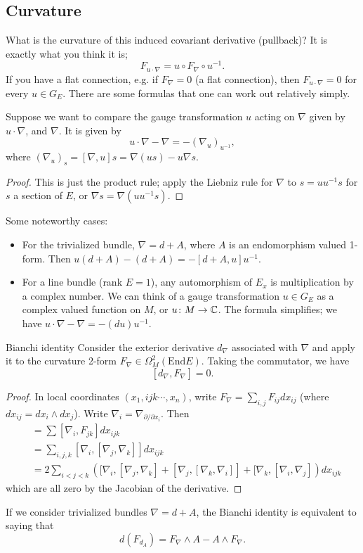 \subsection{Curvature}
What is the curvature of this induced covariant derivative (pullback)? It is exactly what you think it is; \[
F _{u \cdot \nabla}= u \circ F_{\nabla} \circ u^{-1}.
\] If you have a flat connection, e.g. if $F _{\nabla}=0$ (a flat connection), then $F_{u \cdot \nabla}=0$ for every $u \in G_E$. There are some formulas that one can work out relatively simply.
\begin{lemma}
    Suppose we want to compare the gauge transformation $u$ acting on $\nabla$ given by $u \cdot  \nabla$, and $\nabla$. It is given by  \[
        u \cdot \nabla - \nabla = -(\nabla_u) _{u^{-1}}, 
    \] where $(\nabla_u)_s = [\nabla,u]s= \nabla(us)-u\nabla s$. 
\end{lemma}
\begin{proof}
    This is just the product rule; apply the Liebniz rule for $\nabla$ to $s = u u^{-1} s$ for $s$ a section of $E$, or $\nabla s =\nabla(u u^{-1} s)$.
\end{proof}
\begin{example}
    Some noteworthy cases:
    \begin{itemize}
    \setlength\itemsep{-.2em}
\item For the trivialized bundle, $\nabla = d+A$, where $A$ is an endomorphism valued 1-form. Then $u(d+A) - (d+A) = -[d+A,u]u^{-1}$.
\item For a line bundle (rank $E=1$), any automorphism of $E_x$ is multiplication by a complex number. We can think of a gauge transformation $u \in G_E$ as a complex valued function on $M$, or $u \colon M \to \mathbb{C}$. The formula simplifies; we have $u \cdot \nabla- \nabla = -(du)u^{-1}$.
    \end{itemize}
\end{example}
\begin{namedthm}{Bianchi identity} 
    Consider the exterior derivative $d_{\nabla}$ associated with $\nabla$ and apply it to the curvature 2-form $F _{\nabla}\in \Omega^2_M(\mathrm{End}E)$. Taking the commutator, we have \[
        [d_{\nabla},F_{\nabla}]=0.
    \] 
\end{namedthm}
\begin{proof}
    In local coordinates $(x_1,ijk\cdots ,x_n )$, write $F_{\nabla} =\sum _{i,j}F_{ij}dx_{ij}$ (where $dx_{ij}=dx_i \wedge dx_j $). Write $\nabla_i =\nabla_{\partial  /\partial x_i }$. Then
    \begin{align*}
        [d_{\nabla},F_{\nabla}]&= \sum [\nabla _i , F_{jk}] dx_{ijk}\\
                               &= \sum_{i,j,k} [\nabla_i , [\nabla_j ,\nabla_k]] dx_{ijk}\\
                               &=2\sum _{i<j<k}\left([\nabla_i ,[\nabla_j ,\nabla_k] + [\nabla_j ,[\nabla_k,\nabla_i ]]+[\nabla_k,[\nabla_i ,\nabla_j ]\right)dx_{ijk}
    \end{align*}which are all zero by the Jacobian of the derivative.
\end{proof}
If we consider trivialized bundles $\nabla=d+A$, the Bianchi identity is equivalent to saying that \[
    d(F _{d_A})= F_{\nabla} \wedge A - A \wedge F_{\nabla}.
\] 
